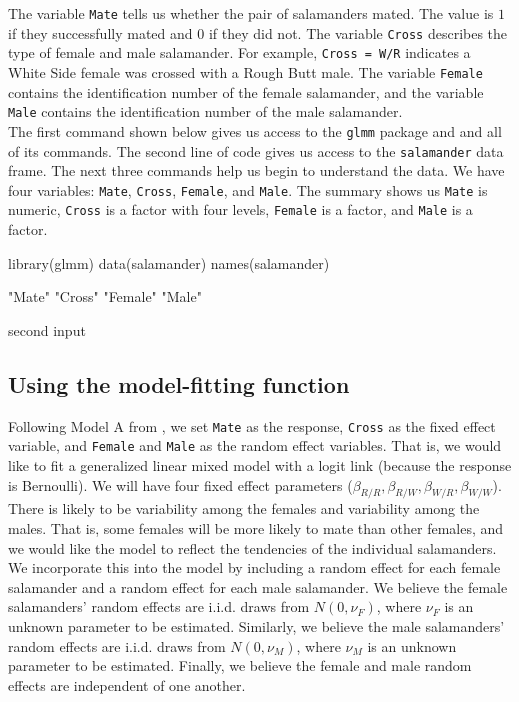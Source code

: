 \documentclass[article]{jss}
\begin{document}
The variable \texttt{Mate} tells us whether the pair of salamanders mated. The value is $1$ if they successfully mated and $0$ if they did not. The variable \texttt{Cross} describes the type of female and male salamander. For example, \texttt{Cross = W/R} indicates a White Side female was crossed with a Rough Butt male. The variable \texttt{Female} contains the identification number of the female salamander, and the variable \texttt{Male} contains the identification number of the male salamander.\\ 

The first   command shown below gives us access to the \texttt{glmm} package and and all of its commands. The second line of code gives us access to the \texttt{salamander} data frame.  The next three commands help us begin to understand the data. We have four variables: \texttt{Mate}, \texttt{Cross}, \texttt{Female}, and \texttt{Male}. The summary shows us \texttt{Mate} is numeric, \texttt{Cross} is a factor with four levels, \texttt{Female} is a factor, and \texttt{Male} is a factor. 

\begin{CodeChunk}
\begin{CodeInput}
library(glmm)
data(salamander)
names(salamander)
\end{CodeInput}
\begin{CodeOutput}
[1] "Mate" "Cross" "Female" "Male"
\end{CodeOutput}
\begin{CodeInput}
second input
\end{CodeInput}
\end{CodeChunk}


\subsection{Using the model-fitting function}

  Following Model A from \citet{karim:zeger:1992}, we set \texttt{Mate} as the response, \texttt{Cross} as the fixed effect variable, and \texttt{Female} and \texttt{Male} as the random effect variables. That is, we would like to fit a generalized linear mixed model with a logit link (because the response is Bernoulli). We will have four fixed effect parameters ($\beta_{R/R}, \beta_{R/W},\beta_{W/R},\beta_{W/W}$). There is likely to be variability among the females and variability among the males. That is, some females will be more likely to mate than other females, and we would like the model to reflect the tendencies of the individual salamanders. We incorporate this into the model by including a random effect for each female salamander and a random effect for each male salamander. We believe the female salamanders' random effects are i.i.d. draws from $N(0, \nu_F)$, where $\nu_F$ is an unknown parameter to be estimated. Similarly, we believe the male salamanders' random effects are i.i.d. draws from $N(0,\nu_M)$, where $\nu_M$ is an unknown parameter to be estimated. Finally, we believe the female and male random effects are independent of one another. \\
\end{document}
